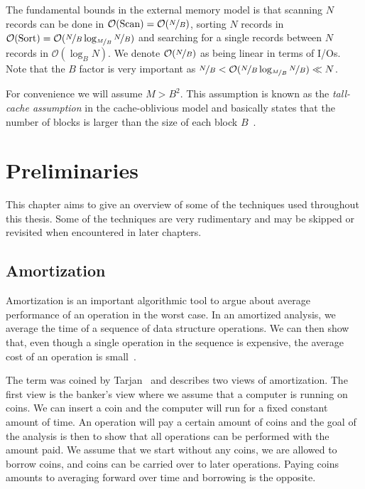 \documentclass[twoside,11pt,openright]{report}
\begin{document}
The fundamental bounds in the external memory model is that scanning $N$ records can be done in $\mathcal{O}(\text{Scan}) = \mathcal{O}(\nicefrac{N}{B})$, sorting $N$ records in $\mathcal{O}(\text{Sort}) = \mathcal{O}(\nicefrac{N}{B} \log_{\nicefrac{M}{B}}\nicefrac{N}{B})$ and searching for a single records between $N$ records in $\mathcal{O}(\log_B N)$. We denote $\mathcal{O}(\nicefrac{N}{B})$ as being linear in terms of I/Os. Note that the $B$ factor is very important as $\nicefrac{N}{B} < \mathcal{O}(\nicefrac{N}{B} \log_{\nicefrac{M}{B}}\nicefrac{N}{B}) \ll N$.

For convenience we will assume $M > B^2$. This assumption is known as the \textit{tall-cache assumption} in the cache-oblivious model and basically states that the number of blocks  is larger than the size of each block $B$~\cite{Prokop99cache-obliviousalgorithms}.

\chapter{Preliminaries}
\label{chp:prelims}
This chapter aims to give an overview of some of the techniques used throughout this thesis. Some of the techniques are very rudimentary and may be skipped or revisited when encountered in later chapters.

\section{Amortization}
Amortization is an important algorithmic tool to argue about average performance of an operation in the worst case.
In an amortized analysis, we average the time of a sequence of data structure operations. We can then show that, even though a single operation in the sequence is expensive, the average cost of an operation is small~\cite[p.~451-452]{clrs}.

The term was coined by Tarjan~\cite{Tarjan85} and describes two views of amortization. The first view is the banker's view where we assume that a computer is running on coins. We can insert a coin and the computer will run for a fixed constant amount of time. An operation will pay a certain amount of coins and the goal of the analysis is then to show that all operations can be performed with the amount paid. We assume that we start without any coins, we are allowed to borrow coins, and coins can be carried over to later operations. Paying coins amounts to averaging forward over time and borrowing is the opposite.
\end{document}
